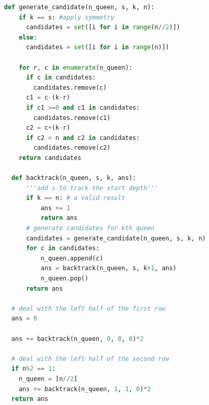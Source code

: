 \documentclass[../main.tex]{subfiles}
\begin{document}
\begin{enumerate}
\begin{lstlisting}[language=Python]
  def generate_candidate(n_queen, s, k, n):
    if k == s: #apply symmetry
      candidates = set([i for i in range(n//2)])
    else:
      candidates = set([i for i in range(n)])

    for r, c in enumerate(n_queen):
      if c in candidates:
        candidates.remove(c)
      c1 = c-(k-r)
      if c1 >=0 and c1 in candidates:
        candidates.remove(c1)
      c2 = c+(k-r)
      if c2 < n and c2 in candidates:
        candidates.remove(c2)
    return candidates

  def backtrack(n_queen, s, k, ans):
      '''add s to track the start depth'''
      if k == n: # a valid result
          ans += 1
          return ans
      # generate candidates for kth queen
      candidates = generate_candidate(n_queen, s, k, n)
      for c in candidates:
          n_queen.append(c)
          ans = backtrack(n_queen, s, k+1, ans)
          n_queen.pop()
      return ans
    
  # deal with the left half of the first row
  ans = 0

  ans += backtrack(n_queen, 0, 0, 0)*2
  
  # deal with the left half of the second row
  if n%2 == 1:
    n_queen = [n//2]
    ans += backtrack(n_queen, 1, 1, 0)*2
  return ans
\end{lstlisting}
\end{enumerate}
\end{document}
